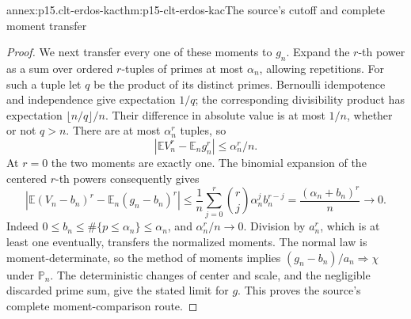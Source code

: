 \begin{annexitem}{annex:p15.clt-erdos-kac}{thm:p15-clt-erdos-kac}{The source's cutoff and complete moment transfer}
\begin{proof}
We next transfer every one of these moments to \(g_n\).
Expand the \(r\)-th power as a sum over ordered \(r\)-tuples
of primes at most \(\alpha_n\), allowing repetitions.
For such a tuple let \(q\) be the product of its distinct primes.
Bernoulli idempotence and independence give expectation \(1/q\);
the corresponding divisibility product has expectation
\(\lfloor n/q\rfloor/n\). Their difference in absolute value
is at most \(1/n\), whether or not \(q>n\).
There are at most \(\alpha_n^r\) tuples, so
\[
 |\mathbb EV_n^r-\mathbb E_ng_n^r|
                         \leq\alpha_n^r/n.
 \]
At \(r=0\) the two moments are exactly one.
The binomial expansion of the centered \(r\)-th powers consequently
gives
\[
 |\mathbb E(V_n-b_n)^r-\mathbb E_n(g_n-b_n)^r|
 \leq \frac1n\sum_{j=0}^r\binom rj
                  \alpha_n^j b_n^{r-j}
 =\frac{(\alpha_n+b_n)^r}{n}\longrightarrow0.
 \]
Indeed \(0\leq b_n\leq\#\{p\leq\alpha_n\}\leq\alpha_n\),
and \(\alpha_n^r/n\to0\). Division by \(a_n^r\), which
is at least one eventually, transfers the normalized moments.
The normal law is moment-determinate, so the method of moments
implies \((g_n-b_n)/a_n\Rightarrow\chi\) under \(\mathbb P_n\).
The deterministic changes of center and scale, and the negligible
discarded prime sum, give the stated limit for \(g\).
This proves the source's complete moment-comparison route.
\end{proof}
\end{annexitem}

